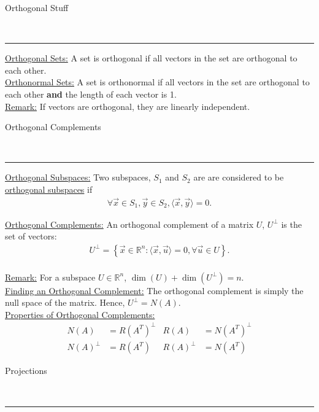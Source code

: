\documentclass{article}
\newcommand{\header}[1]{\begin{large}\noindent #1\end{large}\\\rule{\textwidth}{0.5pt}}
\newcommand{\gap}{\medskip\\}
\newcommand{\sheader}[1]{\underline{#1:}}
\newcommand{\curly}[1]{\left\{#1\right\}}
\begin{document}
\header{Orthogonal Stuff}
\sheader{Orthogonal Sets} A set is orthogonal if all vectors in the set 
are orthogonal to each other.
\gap
\sheader{Orthonormal Sets} A set is orthonormal if all vectors in the set 
are orthogonal to each other \textbf{and} the length of each vector is 1.
\gap
\sheader{Remark} If vectors are orthogonal, they are linearly independent. 
\gap
\header{Orthogonal Complements}
\sheader{Orthogonal Subspaces} Two subspaces, $S_1$ and $S_2$ are are considered to be 
\underline{orthogonal subspaces} if
\begin{align*}
    \forall \vec{x} \in S_1, \vec{y} \in S_2, \langle\vec{x}, \vec{y}\rangle = 0.
\end{align*}

\sheader{Orthogonal Complements} An orthogonal complement of 
a matrix $U$, $U^\perp$ is the set of vectors:
\begin{align*}
    U^\perp = \curly{\vec{x} \in \mathbb{R}^n : \langle\vec{x}, \vec{u}\rangle = 0, \forall \vec{u} \in U}. 
\end{align*}
\gap
\sheader{Remark} For a subspace $U \in \mathbb{R}^n$, $\dim(U) + \dim(U^\perp) = n$.
\gap
\sheader{Finding an Orthogonal Complement} The orthogonal complement is 
simply the null space of the matrix. Hence, $U^\perp = N(A)$.
\gap
\sheader{Properties of Orthogonal Complements}
\begin{align*}
    N(A) &= R(A^T)^\perp & R(A) &= N(A^T)^\perp\\
    N(A)^\perp &= R(A^T) & R(A)^\perp &= N(A^T)
\end{align*}

\header{Projections}
\end{document}
